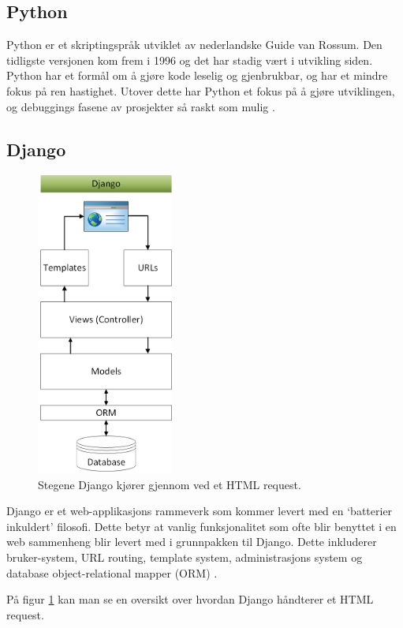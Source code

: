 \subsection{Python}
Python er et skriptingspråk utviklet av nederlandske Guide van Rossum. Den tidligste versjonen kom frem i 1996 og det har stadig vært i utvikling siden. Python har et formål om å gjøre kode leselig og gjenbrukbar, og har et mindre fokus på ren hastighet. Utover dette har Python et fokus på å gjøre utviklingen, og debuggings fasene av prosjekter så raskt som mulig \cite[s. 11]{bachelor}.
\subsection{Django}

\begin{figure}
\caption[Django Oversikt]{Stegene Django kjører gjennom ved et HTML request. }\label{wrap-fig:1}
\includegraphics[width=4.5cm]{Bilder/django.png}
\end{figure}

Django er et web-applikasjons rammeverk som kommer levert med en ‘batterier inkuldert' filosofi. Dette betyr at vanlig funksjonalitet som ofte blir benyttet i en web sammenheng blir levert med i grunnpakken til Django. Dette inkluderer bruker-system, URL routing, template system, administrasjons system og database object-relational mapper (ORM) \cite{django:what}.





På figur \ref{wrap-fig:1} kan man se en oversikt over hvordan Django håndterer et HTML request. 

